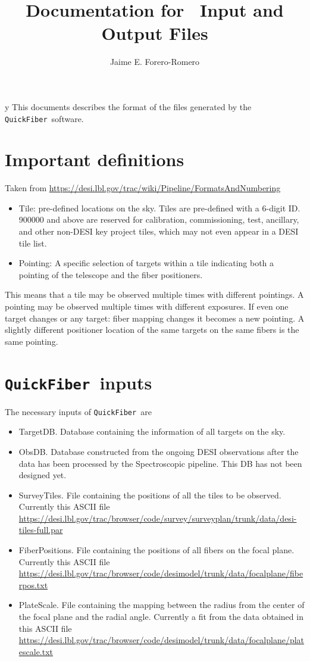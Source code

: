 \documentclass{article}
\title{Documentation for \code\ Input and Output Files}
\author{Jaime E. Forero-Romero}
\newcommand{\code}{{\texttt{QuickFiber}}}
\begin{document}
\maketitle
\tableofcontents 
y
\vspace{1cm}
This documents describes the format of the files generated by the
\code\ software.  

\section{Important definitions}
Taken from \url{https://desi.lbl.gov/trac/wiki/Pipeline/FormatsAndNumbering}
\begin{itemize}

  \item Tile: pre-defined locations on the sky. Tiles are pre-defined
    with a 6-digit ID. 900000 and above are reserved for calibration,
    commissioning, test, ancillary, and other non-DESI key project
    tiles, which may not even appear in a DESI tile list.  
  \item Pointing: A specific
    selection of targets within a tile indicating both a pointing of the
    telescope and the fiber positioners.  
\end{itemize}

This means that a tile may be observed
multiple times with different pointings. A pointing may be observed
multiple times with different exposures. If even one target changes
or any target: fiber mapping changes it becomes a new pointing. A
slightly different positioner location of the same targets on the
same fibers is the same pointing.  

\section{\code\ inputs}
The necessary inputs of \code\ are 
\begin{itemize}
\item TargetDB. Database containing the information of all targets on the sky. 
\item ObsDB. Database constructed from the ongoing DESI
observations after the data has been processed by the Spectroscopic
pipeline. This DB has not been designed yet. 
\item SurveyTiles. File containing the positions of all the tiles to
  be observed. 
Currently this ASCII file\\
  \url{https://desi.lbl.gov/trac/browser/code/survey/surveyplan/trunk/data/desi-tiles-full.par}  
\item FiberPositions. File containing the positions of all fibers on
  the focal plane.  
Currently this ASCII file\\
  \url{https://desi.lbl.gov/trac/browser/code/desimodel/trunk/data/focalplane/fiberpos.txt} 
\item PlateScale. File containing the mapping between the radius from
  the center of the focal plane and the radial angle.
  Currently a fit from the data obtained in this ASCII file\\
  \url{https://desi.lbl.gov/trac/browser/code/desimodel/trunk/data/focalplane/platescale.txt} 
\end{itemize}
\end{document}
